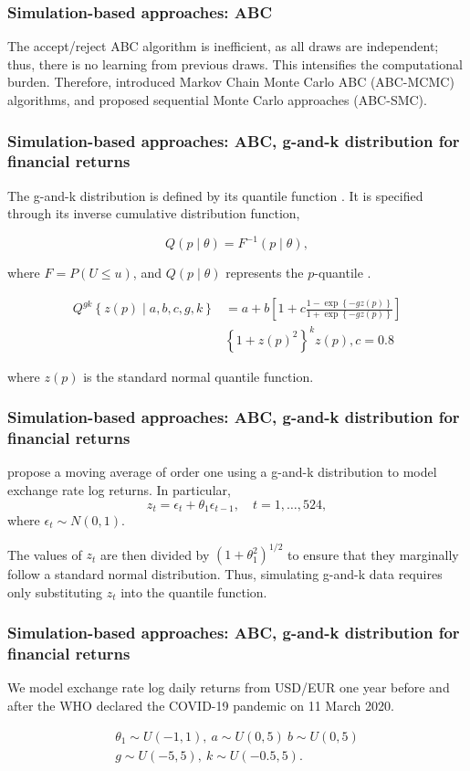 \documentclass[12pt, compress]{beamer}
\begin{document}
\begin{frame}
	\frametitle{Simulation-based approaches: ABC}
The accept/reject ABC algorithm is inefficient, as all draws are independent; thus, there is no learning from previous draws. This intensifies the computational burden. Therefore, \cite{marjoram2003markov, wegmann2009efficient} introduced Markov Chain Monte Carlo ABC (ABC-MCMC) algorithms, and \cite{sisson2007sequential, drovandi2011estimation, del2012adaptive, lenormand2013adaptive} proposed sequential Monte Carlo approaches (ABC-SMC).
\end{frame}

\begin{frame}
	\frametitle{Simulation-based approaches: ABC, g-and-k distribution for financial returns}
The g-and-k distribution is defined by its quantile function \citep{drovandi2011likelihood}. It is specified through its inverse cumulative distribution function,

\[
Q(p\mid{\theta}) = F^{-1}(p\mid{\theta}),
\]

where \( F = P(U \leq u) \), and \( Q (p\mid{\theta}) \) represents the \( p \)-quantile \citep{rayner2002numerical}.

\begin{align*}
    Q^{gk}\left\{z(p)\mid a, b, c, g, k\right\} & = a + b\left[1 + c \frac{1 - \exp\left\{-gz(p)\right\}}{1 + \exp\left\{-gz(p)\right\}}\right]\\
    &\left\{1 + z(p)^2\right\}^k z(p), c = 0.8
\end{align*}

where \( z(p) \) is the standard normal quantile function.
\end{frame}

\begin{frame}
	\frametitle{Simulation-based approaches: ABC, g-and-k distribution for financial returns}
\cite{drovandi2011likelihood} propose a moving average of order one using a g-and-k distribution to model exchange rate log returns. In particular,  
\[
z_t = \epsilon_t + \theta_1\epsilon_{t-1}, \quad t=1,\dots,524,
\]  
where \(\epsilon_t \sim N(0,1)\).  

The values of \(z_t\) are then divided by \((1+\theta_1^2)^{1/2}\) to ensure that they marginally follow a standard normal distribution. Thus, simulating g-and-k data requires only substituting \(z_t\) into the quantile function.
\end{frame}

\begin{frame}
	\frametitle{Simulation-based approaches: ABC, g-and-k distribution for financial returns}
We model exchange rate log daily returns from USD/EUR one year before and after the WHO declared the COVID-19 pandemic on 11 March 2020.

\begin{align*}
	\theta_1\sim U(-1,1), \ a\sim U(0,5) \ b\sim U(0,5)\\
	g\sim U(-5,5), \ k\sim U(-0.5, 5).
\end{align*}
\end{frame}
\end{document}
